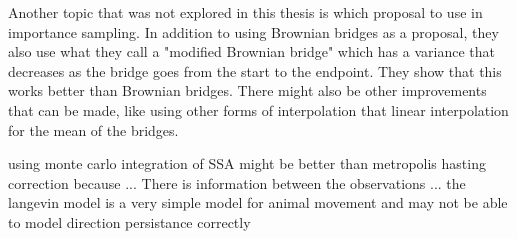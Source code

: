 Another topic that was not explored in this thesis is which proposal to use in importance sampling. In addition to using Brownian bridges as a proposal, they also use what they call a "modified Brownian bridge" which has a variance that decreases as the bridge goes from the start to the endpoint. They show that this works better than Brownian bridges. There might also be other improvements that can be made, like using other forms of interpolation that linear interpolation for the mean of the bridges. 


using monte carlo integration of SSA might be better than metropolis hasting correction because ... There is information between the observations ... 
the langevin model is a very simple model for animal movement and may not be able to model direction persistance correctly
